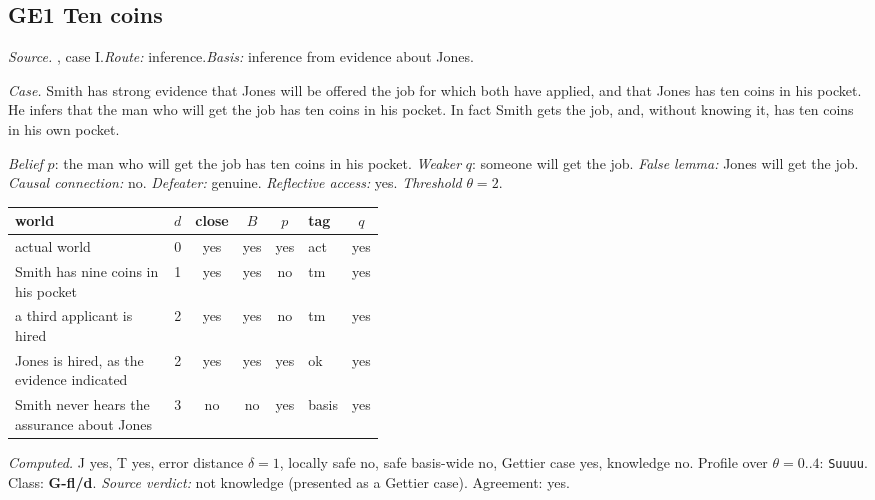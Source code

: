 \subsection*{GE1 \enspace Ten coins}
\noindent\textit{Source.} \citet{Gettier1963}, case I.\quad \textit{Route:} inference.\quad \textit{Basis:} inference from evidence about Jones.\par
\noindent\textit{Case.} Smith has strong evidence that Jones will be offered the job for which both have applied, and that Jones has ten coins in his pocket. He infers that the man who will get the job has ten coins in his pocket. In fact Smith gets the job, and, without knowing it, has ten coins in his own pocket.\par
\noindent\textit{Belief} $p$: the man who will get the job has ten coins in his pocket.
 \textit{Weaker} $q$: someone will get the job.
 \textit{False lemma:} Jones will get the job. \textit{Causal connection:} no. \textit{Defeater:} genuine. \textit{Reflective access:} yes. \textit{Threshold} $\theta = 2$.\par
\begin{center}\begin{tabular}{@{}p{0.43\linewidth}rccclc@{}}
world & $d$ & close & $B$ & $p$ & tag & $q$ \\ \midrule
actual world & 0 & yes & yes & yes & act & yes \\
Smith has nine coins in his pocket & 1 & yes & yes & no & tm & yes \\
a third applicant is hired & 2 & yes & yes & no & tm & yes \\
Jones is hired, as the evidence indicated & 2 & yes & yes & yes & ok & yes \\
Smith never hears the assurance about Jones & 3 & no & no & yes & basis & yes \\
\end{tabular}\end{center}
\noindent\textit{Computed.} J yes, T yes, error distance $\delta = 1$, locally safe no, safe basis-wide no, Gettier case yes, knowledge no. Profile over $\theta = 0..4$: \texttt{Suuuu}. Class: \textbf{G-fl/d}.
 \textit{Source verdict:} not knowledge (presented as a Gettier case). Agreement: yes.
\par\medskip
{}
